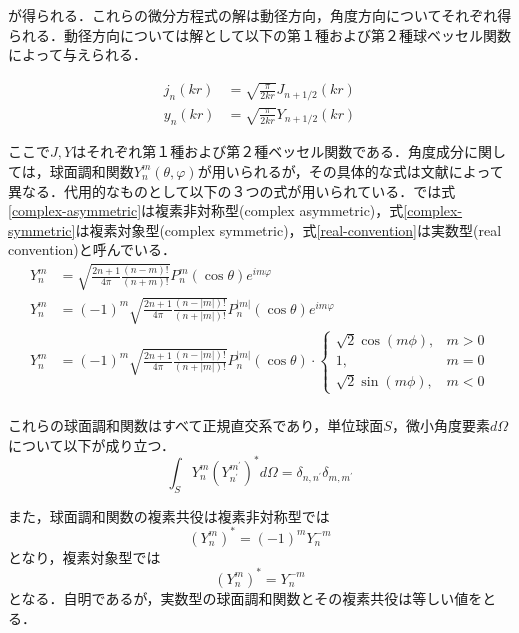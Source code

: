 \documentclass[a4paper,12pt]{jsarticle}
\begin{document}
が得られる．これらの微分方程式の解は動径方向，角度方向についてそれぞれ得られる．動径方向については解として以下の第１種および第２種球ベッセル関数によって与えられる．

\begin{align*}
    j_{n}(k r) & =\sqrt{\frac{\pi}{2 k r}} J_{n+1 / 2}(k r) \\
    y_{n}(k r) & =\sqrt{\frac{\pi}{2 k r}} Y_{n+1 / 2}(k r)
\end{align*}

ここで$J, Y$はそれぞれ第１種および第２種ベッセル関数である．角度成分に関しては，球面調和関数$Y_{n}^{m}(\theta, \varphi)$が用いられるが，その具体的な式は文献によって異なる．代用的なものとして以下の３つの式が用いられている．\cite{Andersson_undated-qg}では式\ref{complex-asymmetric}は複素非対称型(complex asymmetric)，式\ref{complex-symmetric}は複素対象型(complex symmetric)，式\ref{real-convention}は実数型(real convention)と呼んでいる．
\begin{align}
    Y_{n}^{m} & =\sqrt{\frac{2 n+1}{4 \pi} \frac{(n-m) !}{(n+m) !}} P_{n}^{m}(\cos \theta) e^{i m \varphi} \label{complex-asymmetric}                                          \\
    Y_{n}^{m} & =(-1)^{m} \sqrt{\frac{2 n+1}{4 \pi} \frac{(n-|m|) !}{(n+|m|) !}} P_{n}^{|m|}(\cos \theta) e^{i m \varphi}  \label{complex-symmetric}                           \\
    Y_{n}^{m} & =(-1)^{m} \sqrt{\frac{2 n+1}{4 \pi} \frac{(n-|m|) !}{(n+|m|) !}} P_{n}^{|m|}(\cos \theta) \cdot \left\{\begin{array}{ll}
        \sqrt{2} \cos (m \phi), & m>0 \\
        1,                      & m=0 \\
        \sqrt{2} \sin (m \phi), & m<0
    \end{array}\right.\label{real-convention} \\
\end{align}

これらの球面調和関数はすべて正規直交系であり，単位球面$S$，微小角度要素$d\Omega$について以下が成り立つ．
$$
    \int_{S} Y_{n}^{m}\left(Y_{n^{\prime}}^{m^{\prime}}\right)^{*} d \Omega=\delta_{n, n^{\prime}} \delta_{m, m^{\prime}}
$$

また，球面調和関数の複素共役は複素非対称型では
$$
    \left(Y_{n}^{m}\right)^{*}=(-1)^{m} Y_{n}^{-m}
$$
となり，複素対象型では
$$
    \left(Y_{n}^{m}\right)^{*}=Y_{n}^{-m}
$$
となる．自明であるが，実数型の球面調和関数とその複素共役は等しい値をとる．
\end{document}
